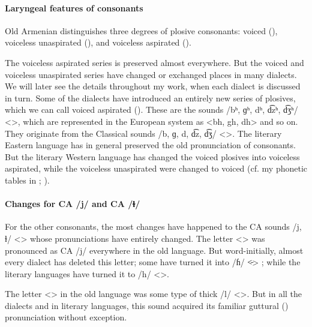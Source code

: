 \begin{adjarianpage}\label{page:17}\end{adjarianpage}%

\paragraph{Laryngeal features of consonants}
Old Armenian distinguishes three degrees of plosive consonants: voiced (), voiceless unaspirated (), and voiceless aspirated (). 

 The voiceless aspirated series is preserved almost everywhere. But the voiced and voiceless unaspirated series have changed or exchanged places in many dialects. We will later see the details throughout my work, when each dialect is discussed in turn. Some of the dialects have introduced an entirely new series of plosives, which we can call voiced aspirated (). These are the sounds /bʰ, ɡʰ, dʰ, d͡zʰ, d͡ʒʰ/ <>, which are represented in the European system as <bh, gh, dh> and so on. They originate from the Classical sounds /b, ɡ, d, d͡z, d͡ʒ/ <>. The literary Eastern language has in general preserved the old pronunciation of consonants. But the literary Western language has changed the voiced plosives into voiceless aspirated, while the voiceless unaspirated were changed to voiced (cf. my phonetic tables in \citealt{Adjarian-1899-ArmenianExplosives}; ). 

\paragraph{Changes for CA /j/ and CA /ɫ/}\label{sec:AdjarianIntro:difference:soundChange:VelarGlide}

For the other consonants, the most changes have happened to the CA sounds /j, ɫ/ <> whose pronunciations have entirely changed. The letter <> was pronounced as CA /j/ everywhere in the old language. But word-initially, almost every dialect has deleted this letter; some have turned it into /ɦ/ <̵> ; while the literary languages have turned it to /h/ <>. 

The letter <> in the old language was some type of thick /l/ <>. But in all the dialects and in literary languages, this sound acquired its familiar guttural () pronunciation without exception. 

